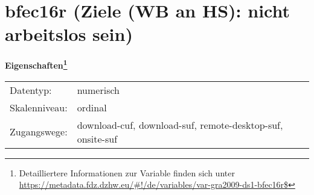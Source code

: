 
    \setcounter{footnote}{0}

    \vspace*{-1.8cm}
	\section{bfec16r (Ziele (WB an HS): nicht arbeitslos sein)}
	\label{section:bfec16r}



    \vspace*{0.5cm}
    \noindent\textbf{Eigenschaften\footnote{Detailliertere Informationen zur Variable finden sich unter
		\url{https://metadata.fdz.dzhw.eu/\#!/de/variables/var-gra2009-ds1-bfec16r$}}}\\
	\begin{tabularx}{\hsize}{@{}lX}
	Datentyp: & numerisch \\
	Skalenniveau: & ordinal \\
	Zugangswege: &
	  download-cuf, 
	  download-suf, 
	  remote-desktop-suf, 
	  onsite-suf
 \\
    \end{tabularx}



